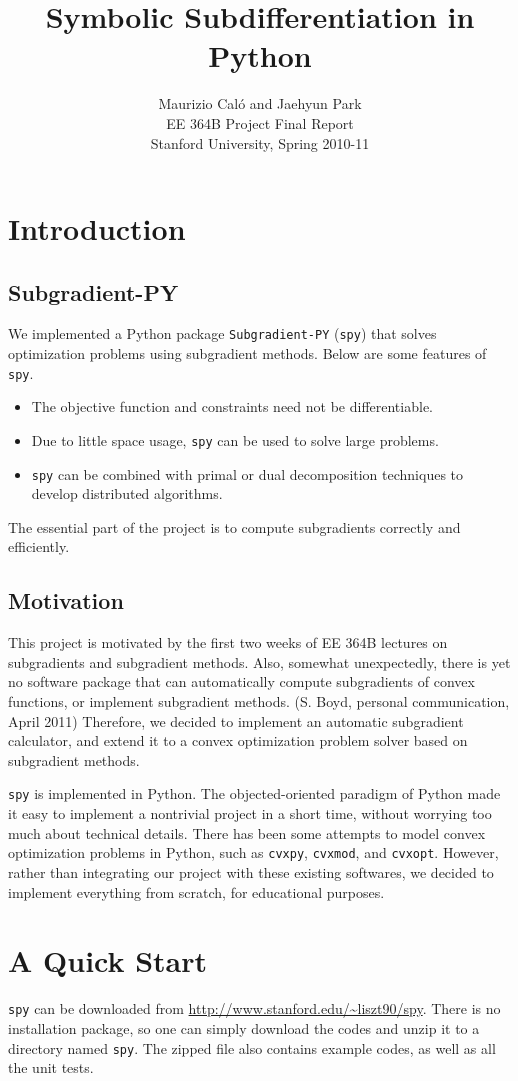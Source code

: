 \documentclass[12pt]{article}
\title{Symbolic Subdifferentiation in Python}
\author{Maurizio Cal\'o and Jaehyun Park\\
EE 364B Project Final Report\\
Stanford University, Spring 2010-11}
\begin{document}
\maketitle

\section{Introduction}
\subsection{Subgradient-PY}
We implemented a Python package \verb'Subgradient-PY' (\verb'spy') that solves
optimization problems using subgradient methods. Below are some features of \verb'spy'.
\begin{itemize}
\item The objective function and constraints need not be differentiable.
\item Due to little space usage, \verb'spy' can be used to solve large problems.
\item \verb'spy' can be combined with primal or dual decomposition techniques to develop distributed algorithms.
\end{itemize}
The essential part of the project is to compute subgradients correctly
and efficiently.

\subsection{Motivation}
This project is motivated by the first two weeks of EE 364B lectures on subgradients and subgradient methods. Also, somewhat unexpectedly, there is yet no software package that can automatically compute subgradients of convex functions, or implement subgradient methods. (S. Boyd, personal communication, April 2011) Therefore, we decided to implement an automatic subgradient calculator, and extend it to a convex optimization problem solver based on subgradient methods.

\verb'spy' is implemented in Python. The objected-oriented paradigm of Python made it easy to implement a nontrivial project in a short time, without worrying too much about technical details. There has been some attempts to model convex optimization problems in Python, such as \verb'cvxpy', \verb'cvxmod', and \verb'cvxopt'. However, rather than integrating our project with these existing softwares, we decided to implement everything from scratch, for educational purposes.

\section{A Quick Start}
\verb'spy' can be downloaded from \url{http://www.stanford.edu/~liszt90/spy}. There is no installation package, so one can simply download the codes and unzip it to a directory named \verb'spy'. The zipped file also contains example codes, as well as all the unit tests.
\end{document}

